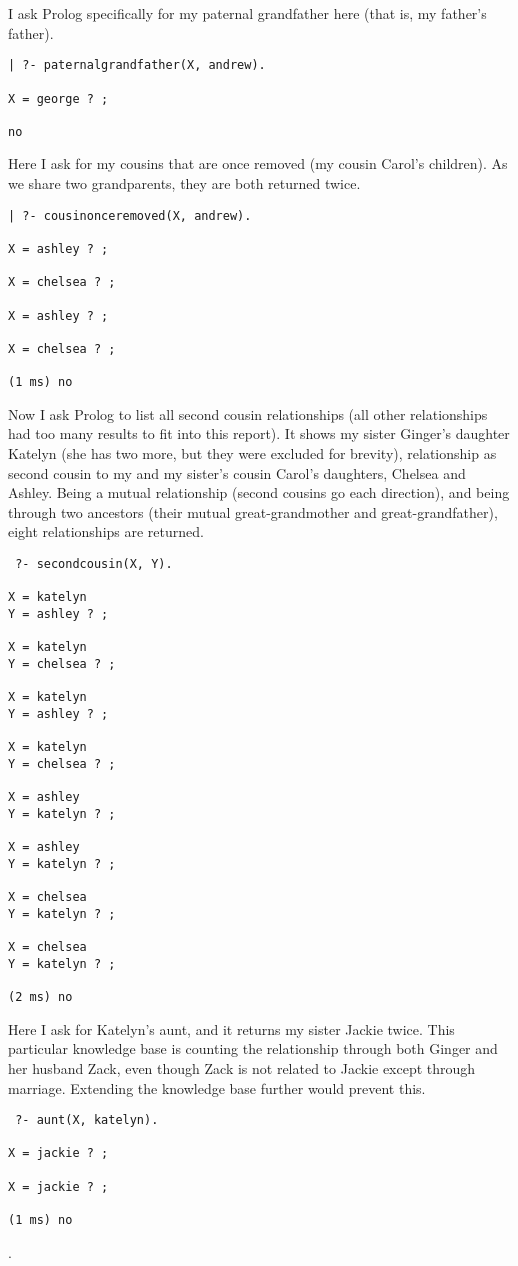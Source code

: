 \documentclass[12pt, article]{scrartcl}
\begin{document}
I ask Prolog specifically for my paternal grandfather here (that is, my father's father).
\begin{verbatim}
| ?- paternalgrandfather(X, andrew).

X = george ? ;

no
\end{verbatim}

Here I ask for my cousins that are once removed (my cousin Carol's children). As we share two grandparents, they are both returned twice.
\begin{verbatim}
| ?- cousinonceremoved(X, andrew).

X = ashley ? ;

X = chelsea ? ;

X = ashley ? ;

X = chelsea ? ;

(1 ms) no
\end{verbatim}

Now I ask Prolog to list all second cousin relationships (all other relationships had too many results to fit into this report). It shows my sister Ginger's daughter Katelyn (she has two more, but they were excluded for brevity), relationship as second cousin to my and my sister's cousin Carol's daughters, Chelsea and Ashley. Being a mutual relationship (second cousins go each direction), and being through two ancestors (their mutual great-grandmother and great-grandfather), eight relationships are returned.
\begin{verbatim}
 ?- secondcousin(X, Y).

X = katelyn
Y = ashley ? ;

X = katelyn
Y = chelsea ? ;

X = katelyn
Y = ashley ? ;

X = katelyn
Y = chelsea ? ;

X = ashley
Y = katelyn ? ;

X = ashley
Y = katelyn ? ;

X = chelsea
Y = katelyn ? ;

X = chelsea
Y = katelyn ? ;

(2 ms) no
\end{verbatim}

Here I ask for Katelyn's aunt, and it returns my sister Jackie twice. This particular knowledge base is counting the relationship through both Ginger and her husband Zack, even though Zack is not related to Jackie except through marriage. Extending the knowledge base further would prevent this.
\begin{verbatim}
 ?- aunt(X, katelyn).

X = jackie ? ;

X = jackie ? ;

(1 ms) no
\end{verbatim}.
\end{document}
